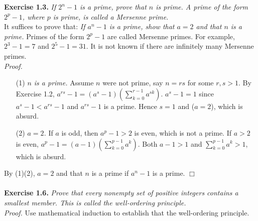 \documentclass{article}
\begin{document}



\textbf{Exercise 1.3.}
\emph{If $2^n - 1$ is a prime, prove that $n$ is prime.
A prime of the form $2^p - 1$, where $p$ is prime, is called a Mersenne prime.} \\

It suffices to prove that:
\emph{If $a^n - 1$ is a prime, show that $a = 2$ and that $n$ is a prime.}
Primes of the form $2^p - 1$ are called Mersenne primes.
For example, $2^3 - 1 = 7$ and $2^5 - 1 = 31$.
It is not known if there are infinitely many Mersenne primes. \\

\emph{Proof.}
\begin{enumerate}
\item[(1)]
\emph{$n$ is a prime.}
Assume $n$ were not prime, say $n = rs$ for some $r, s > 1$.
By Exercise 1.2,
$a^{rs} - 1 = (a^s - 1)(\sum_{k=0}^{r-1} a^{sk})$.
$a^s - 1 = 1$ since $a^s - 1 < a^{rs} - 1$ and $a^{rs} - 1$ is a prime.
Hence $s=1$ and ($a=2$), which is absurd.
\item[(2)]
\emph{$a = 2$.}
If $a$ is odd, then $a^p - 1 > 2$ is even, which is not a prime.
If $a > 2$ is even,
$a^p - 1 = (a - 1)(\sum_{k=0}^{p-1} a^k)$.
Both $a - 1 > 1$ and $\sum_{k=0}^{p-1} a^k > 1$, which is absurd.
\end{enumerate}
By (1)(2), $a = 2$ and that $n$ is a prime if $a^n - 1$ is a prime.
$\Box$ \\\\






\textbf{Exercise 1.6.}
\emph{Prove that every nonempty set of positive integers contains a smallest member.
This is called the well-ordering principle.} \\

\emph{Proof.}
Use mathematical induction to establish
that the well-ordering principle.
\end{document}
